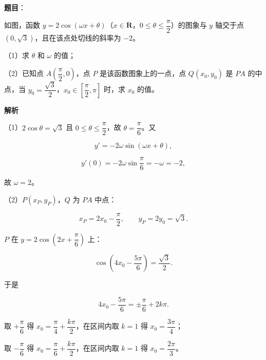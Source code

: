 \begin{answer}

\textbf{题目}：

如图，函数 $y=2\cos(\omega x+\theta)$（$x\in\mathbf R$，$0\leqslant\theta\leqslant\dfrac{\pi}{2}$）的图象与 $y$ 轴交于点 $(0,\sqrt3)$，且在该点处切线的斜率为 $-2$。

（1）求 $\theta$ 和 $\omega$ 的值；

（2）已知点 $A\left(\dfrac{\pi}{2},0\right)$，点 $P$ 是该函数图象上的一点，点 $Q(x_0,y_0)$ 是 $PA$ 的中点，当 $y_0=\dfrac{\sqrt3}{2}$，$x_0\in\left[\dfrac{\pi}{2},\pi\right]$ 时，求 $x_0$ 的值。
\nopagebreak[4]
\begin{center}\end{center}
\nopagebreak[4]
\textbf{解析}

（1）$2\cos\theta=\sqrt3$ 且 $0\leqslant\theta\leqslant\dfrac{\pi}{2}$，故 $\theta=\dfrac{\pi}{6}$。又

\nopagebreak[4]
\[y'=-2\omega\sin(\omega x+\theta),\]

\nopagebreak[4]
\[y'(0)=-2\omega\sin\frac{\pi}{6}=-\omega=-2,\]

故 $\omega=2$。

（2）$P(x_P,y_P)$，$Q$ 为 $PA$ 中点：

\nopagebreak[4]
\[x_P=2x_0-\frac{\pi}{2},\qquad y_P=2y_0=\sqrt3.\]

$P$ 在 $y=2\cos\left(2x+\dfrac{\pi}{6}\right)$ 上：

\nopagebreak[4]
\[\cos\left(4x_0-\frac{5\pi}{6}\right)=\frac{\sqrt3}{2}.\]

于是

\nopagebreak[4]
\[4x_0-\frac{5\pi}{6}=\pm\frac{\pi}{6}+2k\pi.\]

取 $+\dfrac{\pi}{6}$ 得 $x_0=\dfrac{\pi}{4}+\dfrac{k\pi}{2}$，在区间内取 $k=1$ 得 $x_0=\dfrac{3\pi}{4}$；

取 $-\dfrac{\pi}{6}$ 得 $x_0=\dfrac{\pi}{6}+\dfrac{k\pi}{2}$，在区间内取 $k=1$ 得 $x_0=\dfrac{2\pi}{3}$。


\end{answer}
